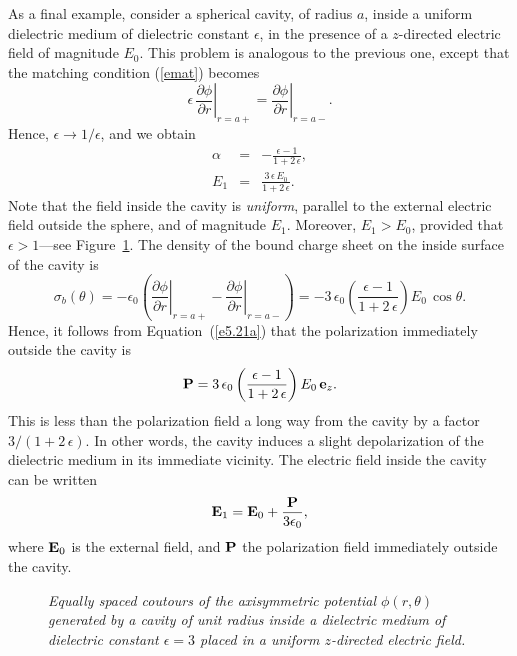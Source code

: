 As a final example, consider a spherical cavity, of radius $a$, inside a
uniform dielectric medium of dielectric constant $\epsilon$, in the presence of a
$z$-directed electric field of magnitude $E_0$. This problem is analogous
to the previous one, except that the matching condition
(\ref{emat}) becomes
\begin{equation}
\left.\epsilon\,\frac{\partial \phi}{\partial r}\right|_{r=a+} = \left.
\frac{\partial\phi}{\partial r}\right|_{r=a-}.
\end{equation}
Hence, $\epsilon\rightarrow1/\epsilon$, and we obtain
\begin{eqnarray}
\alpha &=&- \frac{\epsilon-1}{1+2\,\epsilon},\\[0.5ex]
E_1 &=& \frac{3\,\epsilon\,E_0}{1+2\,\epsilon}.
\end{eqnarray}
Note that the field inside the cavity is  {\em uniform}, parallel
to the external electric field outside the sphere, and of magnitude $E_1$. Moreover, $E_1 > E_0$,  provided that $\epsilon>1$---see Figure~\ref{fex7}. The density
of the bound charge sheet on the inside surface of the cavity
is
\begin{equation}
\sigma_b(\theta) = -\epsilon_0\left(\left.\frac{\partial\phi}{\partial r}\right|_{r=a+}
-\left.\frac{\partial\phi}{\partial r}\right|_{r=a-}\right) = 
-3\,\epsilon_0\left(\frac{\epsilon-1}{1+2\,\epsilon}\right)E_0\,\cos\theta.
\end{equation}
Hence, it follows from Equation~(\ref{e5.21a}) that the polarization immediately
outside the cavity is
\begin{equation}
{\bf P} = 3\,\epsilon_0\left(\frac{\epsilon-1}{1+2\,\epsilon}\right)E_0\,{\bf e}_z.
\end{equation}
This is less than the polarization field a long way from the cavity by a factor
$3/(1+2\,\epsilon)$. In other words, the cavity induces a slight depolarization
of the dielectric medium in its immediate vicinity. The electric field
inside the cavity can be written
\begin{equation}\label{e5.yyy}
{\bf E}_1 = {\bf E}_0 + \frac{\bf P}{3\epsilon_0},
\end{equation}
where ${\bf E}_0$ is the external field, and ${\bf P}$ the polarization field
immediately outside the cavity.
\begin{figure}
\centerline{}
\caption{\em Equally spaced coutours of the axisymmetric potential
$\phi(r,\theta)$ generated by a cavity of unit radius inside a dielectric medium of dielectric constant $\epsilon=3$ placed in a uniform $z$-directed electric field.}\label{fex7}
\end{figure}


